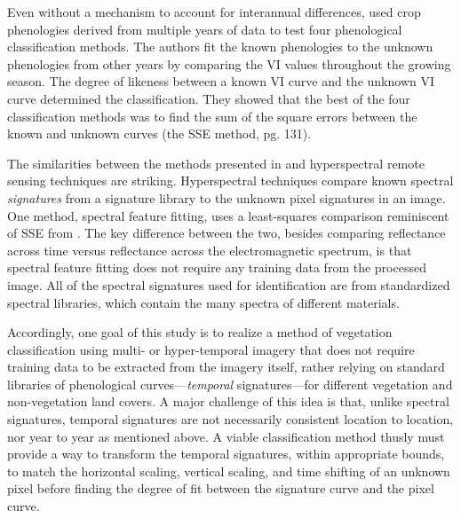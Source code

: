 Even without a mechanism to account for interannual differences, \textcite{brown2007multitemporal} used crop phenologies derived from multiple years of data to test four phenological classification methods. The authors fit the known phenologies to the unknown phenologies from other years by comparing the VI values throughout the growing season. The degree of likeness between a known VI curve and the unknown VI curve determined the classification. They showed that the best of the four classification methods was to find the sum of the square errors between the known and unknown curves (the SSE method, \citeauthor{brown2007multitemporal} pg. 131).

The similarities between the methods presented in \citeauthor{brown2007multitemporal} and hyperspectral remote sensing techniques are striking. Hyperspectral techniques compare known spectral \textit{signatures} from a signature library to the unknown pixel signatures in an image. One method, spectral feature fitting, uses a least-squares comparison reminiscent of SSE from \citeauthor{brown2007multitemporal} \autocites{solutions2013selected}{clark2003imaging}. The key difference between the two, besides comparing reflectance across time versus reflectance across the electromagnetic spectrum, is that spectral feature fitting does not require any training data from the processed image. All of the spectral signatures used for identification are from standardized spectral libraries, which contain the many spectra of different materials.

Accordingly, one goal of this study is to realize a method of vegetation classification using multi- or hyper-temporal imagery that does not require training data to be extracted from the imagery itself, rather relying on standard libraries of phenological curves---\textit{temporal} signatures---for different vegetation and non-vegetation land covers. A major challenge of this idea is that, unlike spectral signatures, temporal signatures are not necessarily consistent location to location, nor year to year as mentioned above. A viable classification method thusly must provide a way to transform the temporal signatures, within appropriate bounds, to match the horizontal scaling, vertical scaling, and time shifting of an unknown pixel before finding the degree of fit between the signature curve and the pixel curve.

